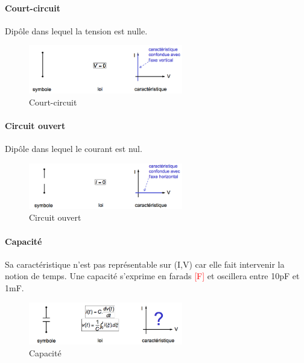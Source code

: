 \documentclass[a4paper]{article}
\begin{document}
    \paragraph{Court-circuit} Dipôle dans lequel la tension est nulle.
    \begin{figure}[H]
        \begin{center}
            \includegraphics[width=0.6\textwidth]{fig/2_courtcircuit.png}
            \caption{Court-circuit}
        \end{center}
    \end{figure}

    \paragraph{Circuit ouvert} Dipôle dans lequel le courant est nul.
    \begin{figure}[H]
        \begin{center}
            \includegraphics[width=0.6\textwidth]{fig/2_circuitouvert.png}
            \caption{Circuit ouvert}
        \end{center}
    \end{figure}

    \paragraph{Capacité} Sa caractéristique n'est pas représentable sur (I,V) car
    elle fait intervenir la notion de temps. Une capacité s'exprime en farads
    \textcolor{red}{[F]} et oscillera entre 10pF et 1mF.
    \begin{figure}[H]
        \begin{center}
            \includegraphics[width=0.6\textwidth]{fig/2_capacite.png}
            \caption{Capacité}
        \end{center}
    \end{figure}
\end{document}
